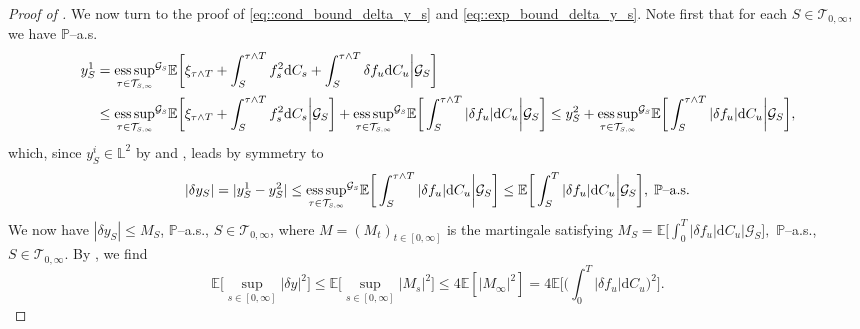 \documentclass[10pt]{article} %
\newcommand\cG{\mathcal G}
\newcommand\cT{\mathcal T}
\newcommand{\smalltext}[1]{\text{\fontsize{4}{4}\selectfont$#1$}}
\def \E{\mathbb{E}}
\def \L{\mathbb{L}}
\def \P{\mathbb{P}}
\newcommand{\1}{\mathbf{1}}
\def\d{\mathrm{d}}
\DeclareMathOperator*{\esssup}{ess\,sup}
\begin{document}
\begin{proof}[Proof of ]
	\medskip
	We now turn to the proof of \eqref{eq::cond_bound_delta_y_s} and \eqref{eq::exp_bound_delta_y_s}. Note first that for each $S \in \cT_{0,\infty}$, we have $\P$--a.s.
	\begin{align*}
		y^1_S &= {\esssup_{\tau \in \cT_{\smalltext{S}\smalltext{,}\smalltext{\infty}}}}^{\cG_\smalltext{S}} \E\bigg[ \xi_{\tau \land T} + \int_S^{\tau \land T} f^2_s \d C_s + \int_S^{\tau \land T} \delta f_u \d C_u \bigg| \cG_S\bigg] \\
		&\leq {\esssup_{\tau \in \cT_{\smalltext{S}\smalltext{,}\smalltext{\infty}}}}^{\cG_\smalltext{S}} \E\bigg[ \xi_{\tau \land T} + \int_S^{\tau \land T} f^2_s \d C_s \bigg| \cG_S \bigg] + {\esssup_{\tau \in \cT_{\smalltext{S}\smalltext{,}\smalltext{\infty}}}}^{\cG_\smalltext{S}} \E\bigg[ \int_S^{\tau \land T} |\delta f_u| \d C_u \bigg| \cG_S\bigg] \leq y^2_S + {\esssup_{\tau \in \cT_{\smalltext{S}\smalltext{,}\smalltext{\infty}}}}^{\cG_\smalltext{S}} \E\bigg[ \int_S^{\tau \land T} |\delta f_u| \d C_u \bigg| \cG_S\bigg], 
	\end{align*}
	which, since $y^i_S \in \L^2$ by  and , leads by symmetry to
	\begin{equation*}
		|\delta y_S| = |y^1_S - y^2_S| \leq {\esssup_{\tau \in \cT_{\smalltext{S}\smalltext{,}\smalltext{\infty}}}}^{\cG_\smalltext{S}} \E\bigg[ \int_S^{\tau \land T} |\delta f_u| \d C_u \bigg| \cG_S\bigg] \leq \E\bigg[ \int_S^T |\delta f_u| \d C_u \bigg| \cG_S\bigg], \; \text{$\P$--a.s.}
	\end{equation*}
	We now have $|\delta y_S| \leq M_S$, $\P$--a.s., $S \in \cT_{0,\infty}$, where $M = (M_t)_{t \in [0,\infty]}$ is the martingale satisfying $M_S = \E\big[ \int_0^T |\delta f_u| \d C_u \big| \cG_S\big],$ $\P$--a.s.,  $S \in \cT_{0,\infty}.$ By , we find
	\begin{equation*}
		\E\bigg[\sup_{s \in [0,\infty]} |\delta y|^2\bigg] \leq \E\bigg[\sup_{s \in [0,\infty]} |M_s|^2\bigg] \leq 4  \E[|M_\infty|^2] = 4  \E\bigg[ \bigg(\int_0^T |\delta f_u| \d C_u\bigg)^2 \bigg].
	\end{equation*}
	

\end{proof}
\end{document}
